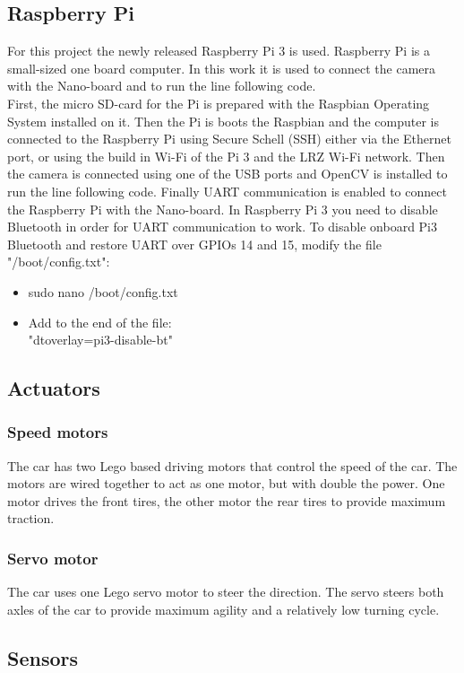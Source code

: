 \documentclass[11pt,twocolumn]{article}
\begin{document}
\subsection{Raspberry Pi}
For this project the newly released Raspberry Pi 3 is used. Raspberry Pi is a small-sized one board computer. In this work it is used to connect the camera with the Nano-board and to run the line following code.\\
First, the micro SD-card for the Pi is prepared with the Raspbian Operating System installed on it. Then the Pi is boots the Raspbian and the computer is connected to the Raspberry Pi using Secure Schell (SSH) either via the Ethernet port, or using the build in Wi-Fi of the Pi 3 and the LRZ Wi-Fi network. Then the camera is connected using one of the USB ports and OpenCV is installed to run the line following code. Finally UART communication is enabled to connect the Raspberry Pi with the Nano-board. In Raspberry Pi 3 you need to disable Bluetooth in order for UART communication to work. To disable onboard Pi3 Bluetooth and restore UART over GPIOs 14 and 15, modify the file "/boot/config.txt":
\begin{itemize}
\item {sudo nano /boot/config.txt}
\item {Add to the end of the file: \\"dtoverlay=pi3-disable-bt"}
\end{itemize}
\subsection{Actuators}
\subsubsection{Speed motors}
The car has two Lego based driving motors that control the speed of the car. The motors are wired together to act as one motor, but with double the power. One motor drives the front tires, the other motor the rear tires to provide maximum traction.
\subsubsection{Servo motor}
The car uses one Lego servo motor to steer the direction. The servo steers both axles of the car to provide maximum agility and a relatively low turning cycle.
\subsection{Sensors} 
\end{document}
